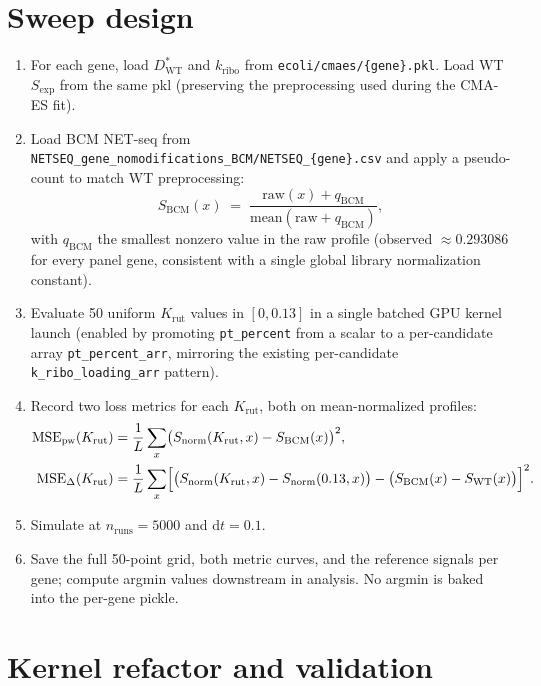 \documentclass[11pt]{article}
\newcommand{\Krut}{K_{\text{rut}}}
\newcommand{\kribo}{k_{\text{ribo}}}
\newcommand{\Dstar}{D^{\!*}}
\newcommand{\DstarWT}{\Dstar_{\text{WT}}}
\newcommand{\Snorm}{S_{\text{norm}}}
\newcommand{\SWT}{S_{\text{WT}}}
\newcommand{\SBCM}{S_{\text{BCM}}}
\begin{document}
\section{Sweep design}

\begin{enumerate}
\item For each gene, load $\DstarWT$ and $\kribo$ from
  \texttt{ecoli/cmaes/\{gene\}.pkl}. Load WT $S_{\text{exp}}$ from the
  same pkl (preserving the preprocessing used during the CMA-ES fit).
\item Load BCM NET-seq from
  \texttt{NETSEQ\_gene\_nomodifications\_BCM/NETSEQ\_\{gene\}.csv} and
  apply a pseudo-count to match WT preprocessing:
  \begin{equation}
    \SBCM(x) \;=\; \frac{\text{raw}(x) + q_{\text{BCM}}}
                      {\mathrm{mean}(\text{raw} + q_{\text{BCM}})},
  \end{equation}
  with $q_{\text{BCM}}$ the smallest nonzero value in the raw profile
  (observed $\approx 0.293086$ for every panel gene, consistent with a
  single global library normalization constant).
\item Evaluate 50 uniform $\Krut$ values in $[0, 0.13]$ in a single
  batched GPU kernel launch (enabled by promoting \texttt{pt\_percent}
  from a scalar to a per-candidate array
  \texttt{pt\_percent\_arr}, mirroring the existing per-candidate
  \texttt{k\_ribo\_loading\_arr} pattern).
\item Record two loss metrics for each $\Krut$, both on
  mean-normalized profiles:
  \begin{align}
    \text{MSE}_{\text{pw}}(\Krut) &=
      \frac{1}{L}\sum_{x}\bigl(\Snorm(\Krut, x) - \SBCM(x)\bigr)^2, \\
    \text{MSE}_{\Delta}(\Krut) &=
      \frac{1}{L}\sum_{x}\Bigl[\bigl(\Snorm(\Krut, x) - \Snorm(0.13, x)\bigr)
      - \bigl(\SBCM(x) - \SWT(x)\bigr)\Bigr]^2.
  \end{align}
\item Simulate at $n_{\text{runs}} = 5000$ and $\mathrm{d}t = 0.1$.
\item Save the full 50-point grid, both metric curves, and the reference
  signals per gene; compute argmin values downstream in analysis. No
  argmin is baked into the per-gene pickle.
\end{enumerate}

\section{Kernel refactor and validation}
\end{document}
